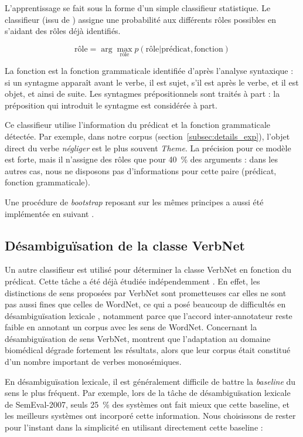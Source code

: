 L'apprentissage se fait sous la forme d'un simple classifieur statistique. Le
classifieur (issu de \cite{swier2004unsupervised}) assigne une probabilité aux
différents rôles possibles en s'aidant des rôles déjà identifiés.

$$ \text{rôle} = \arg\max_{\text{rôle}} p(\text{rôle} \vert \text{prédicat}, \text{fonction})$$

La fonction est la fonction grammaticale identifiée d'après l'analyse
syntaxique : si un syntagme apparaît avant le verbe, il est sujet, s'il est
après le verbe, et il est objet, et ainsi de suite. Les syntagmes
prépositionnels sont traités à part : la préposition qui introduit le syntagme
est considérée à part.

Ce classifieur utilise l'information du prédicat et la fonction grammaticale
détectée. Par exemple, dans notre corpus (section~\ref{subsec:details_exp}),
l'objet direct du verbe \textit{négliger} est le plus souvent \textit{Theme}. La
précision pour ce modèle est forte, mais il n'assigne des rôles que pour 40~\%
des arguments : dans les autres cas, nous ne disposons pas d'informations pour
cette paire (prédicat, fonction grammaticale).

Une procédure de \textit{bootstrap} reposant sur les mêmes principes a aussi
été implémentée en suivant \cite{swier2004unsupervised}.

\subsection{Désambiguïsation de la classe VerbNet}

Un autre classifieur est utilisé pour déterminer la classe VerbNet en fonction
du prédicat.  Cette tâche a été déjà étudiée indépendemment
\citep{abend2008supervised,brown2011verbnet,kawahara2014single}. En effet, les
distinctions de sens proposées par VerbNet sont prometteuses car elles ne sont
pas aussi fines que celles de WordNet, ce qui a posé beaucoup de difficultés en
désambiguïsation lexicale \citep[section 10.1]{navigli2009word}, notamment
parce que l'accord inter-annotateur reste faible en annotant un corpus avec les
sens de WordNet. Concernant la désambiguïsation de sens VerbNet,
\cite{abend2009unsupervised} montrent que l'adaptation au domaine biomédical
dégrade fortement les résultats, alors que leur corpus était constitué d'un
nombre important de verbes monosémiques.

En désambiguïsation lexicale, il est généralement difficile de battre la
\textit{baseline} du sens le plus fréquent. Par exemple, lors de la tâche de
désambiguïsation lexicale de SemEval-2007, seuls 25~\% des systèmes ont fait
mieux que cette baseline, et les meilleurs systèmes ont incorporé cette
information. Nous choisissons de rester pour l'instant dans la simplicité en
utilisant directement cette baseline :

